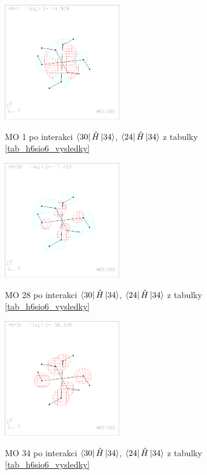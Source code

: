 \documentclass[
  digital, %
  table,   %
  lof,     %
  lot,     %
]{fithesis3}
\begin{document}
  \begin{figure}[h]
\caption{MO 1 po interakci $\bra{30}{\hat{H}}\ket{34}$, $\bra{24}{\hat{H}}\ket{34}$  z tabulky \ref{tab_h6sio6_vysledky}}
  \center
  \includegraphics[width=5cm]{h6sio6_obrazky/s1_1.eps}
  \label{obr_h6sio6_MO_s1_1}
  \end{figure}
 
 \begin{figure}[h]
\caption{MO 28 po interakci $\bra{30}{\hat{H}}\ket{34}$, $\bra{24}{\hat{H}}\ket{34}$  z tabulky \ref{tab_h6sio6_vysledky}}
  \center
  \includegraphics[width=5cm]{h6sio6_obrazky/s1_28.eps}
  \label{obr_h6sio6_MO_s1_28}
  \end{figure}

\begin{figure}[h]
\caption{MO 34 po interakci $\bra{30}{\hat{H}}\ket{34}$, $\bra{24}{\hat{H}}\ket{34}$  z tabulky \ref{tab_h6sio6_vysledky}}
  \center
  \includegraphics[width=5cm]{h6sio6_obrazky/s1_34.eps}
  \label{obr_h6sio6_MO_s1_34}
  \end{figure}
  
\end{document}
